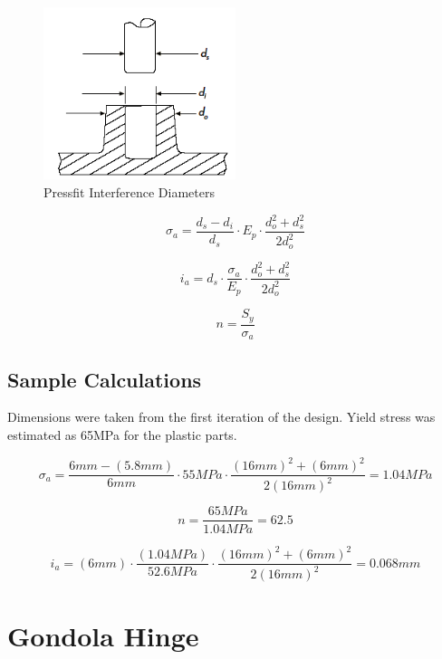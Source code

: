 \documentclass[../main.tex]{subfiles}
\begin{document}
\begin{figure}[H]
	\centering
	\includegraphics[width=0.5\textwidth]{img/analysis/thruster/pressfit.png}
	\caption{Pressfit Interference Diameters \cite{pressfit}}
	\label{fig:pressfit}
\end{figure}

\begin{equation}
\sigma_a=\frac{d_s-d_i}{d_s}\cdot{}E_p\cdot{}
\frac{d_o^2+d_s^2}{2d_o^2}
\end{equation}

\begin{equation}
i_a=d_s\cdot{}\frac{\sigma_a}{E_p}\cdot{}
\frac{d_o^2+d_s^2}{2d_o^2}
\end{equation}

\begin{equation}
n=\frac{S_y}{\sigma_a}
\end{equation}

\subsection{Sample Calculations}
Dimensions were taken from the first iteration of the design. Yield stress was estimated as 65MPa for the plastic parts.
 
\begin{equation*}
\sigma_a=\frac{6mm-(5.8mm)}{6mm}\cdot{}55MPa\cdot{}
\frac{(16mm)^2+(6mm)^2}{2(16mm)^2}=1.04MPa
\end{equation*}

\begin{equation*}
n=\frac{65MPa}{1.04MPa}=62.5
\end{equation*}

\begin{equation*}
i_a=(6mm)\cdot{}\frac{(1.04MPa)}{52.6MPa}\cdot{}
\frac{(16mm)^2+(6mm)^2}{2(16mm)^2}=0.068mm
\end{equation*}
	
\section{Gondola Hinge} \label{appendix:gondolaHinge}
\end{document}
